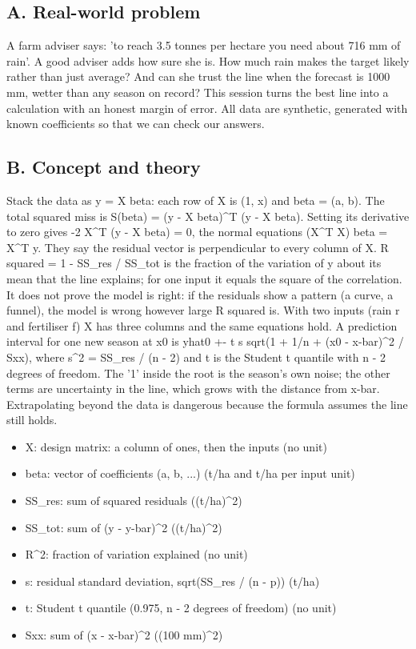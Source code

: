 \documentclass[11pt,a4paper]{article}
\begin{document}
\subsection*{A. Real-world problem}
A farm adviser says: 'to reach 3.5 tonnes per hectare you need about 716 mm of rain'. A good adviser adds how sure she is. How much rain makes the target likely rather than just average? And can she trust the line when the forecast is 1000 mm, wetter than any season on record? This session turns the best line into a calculation with an honest margin of error. All data are synthetic, generated with known coefficients so that we can check our answers.

\subsection*{B. Concept and theory}
Stack the data as y = X beta: each row of X is (1, x) and beta = (a, b). The total squared miss is S(beta) = (y - X beta)\textasciicircum{}T (y - X beta). Setting its derivative to zero gives -2 X\textasciicircum{}T (y - X beta) = 0, the normal equations (X\textasciicircum{}T X) beta = X\textasciicircum{}T y. They say the residual vector is perpendicular to every column of X. R squared = 1 - SS\_res / SS\_tot is the fraction of the variation of y about its mean that the line explains; for one input it equals the square of the correlation. It does not prove the model is right: if the residuals show a pattern (a curve, a funnel), the model is wrong however large R squared is. With two inputs (rain r and fertiliser f) X has three columns and the same equations hold. A prediction interval for one new season at x0 is yhat0 +- t s sqrt(1 + 1/n + (x0 - x-bar)\textasciicircum{}2 / Sxx), where s\textasciicircum{}2 = SS\_res / (n - 2) and t is the Student t quantile with n - 2 degrees of freedom. The '1' inside the root is the season's own noise; the other terms are uncertainty in the line, which grows with the distance from x-bar. Extrapolating beyond the data is dangerous because the formula assumes the line still holds.

\begin{itemize}[nosep]
\item X: design matrix: a column of ones, then the inputs (no unit)
\item beta: vector of coefficients (a, b, ...) (t/ha and t/ha per input unit)
\item SS\_res: sum of squared residuals ((t/ha)\textasciicircum{}2)
\item SS\_tot: sum of (y - y-bar)\textasciicircum{}2 ((t/ha)\textasciicircum{}2)
\item R\textasciicircum{}2: fraction of variation explained (no unit)
\item s: residual standard deviation, sqrt(SS\_res / (n - p)) (t/ha)
\item t: Student t quantile (0.975, n - 2 degrees of freedom) (no unit)
\item Sxx: sum of (x - x-bar)\textasciicircum{}2 ((100 mm)\textasciicircum{}2)
\end{itemize}
\end{document}
